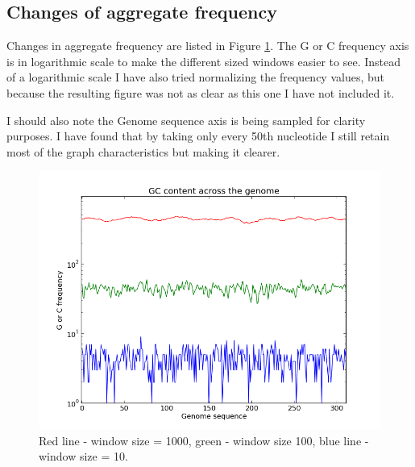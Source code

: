 \documentclass[a4paper,11pt]{article}
\begin{document}
\subsection{Changes of aggregate frequency}
Changes in aggregate frequency are listed in Figure \ref{log}. The G or C frequency axis is in logarithmic scale to make the different sized windows easier to see. Instead of a logarithmic scale I have also tried normalizing the frequency values, but because the resulting figure was not as clear as this one I have not included it. 

I should also note the Genome sequence axis is being sampled for clarity purposes. I have found that by taking only every 50th nucleotide I still retain most of the graph characteristics but making it clearer. 
\begin{figure}[h!]
\begin{center}
\includegraphics[scale=0.65]{3_log_all.png}
\caption{Red line - window size = 1000, green - window size 100, blue line - window size = 10.}
\label{log}
\end{center}
\end{figure}
\end{document}
